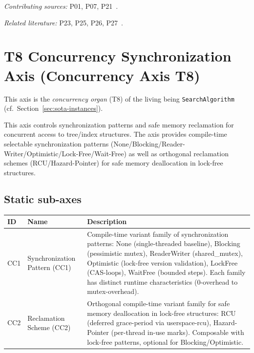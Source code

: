 \emph{Contributing sources:} P01, P07, P21~\cite{leis2013art,wu2019wormhole,chen2001prefetch}.

\emph{Related literature:} P23, P25, P26, P27~\cite{khan2010adaptive,mahling2025hotpath,zhang2024pathprefix,zhang2025hierarchical}.

\section[head={T8 Concurrency Synchronization Axis (Concurrency Axis)}]{T8 Concurrency Synchronization Axis (Concurrency Axis T8)}

This axis is the \emph{concurrency organ} (T8) of the living being \texttt{SearchAlgorithm} (cf.\ Section~\ref{sec:sota-instances}).

This axis controls synchronization patterns and safe memory reclamation for concurrent access to tree/\allowbreak{}index structures. The axis provides compile-time selectable synchronization patterns (None/\allowbreak{}Blocking/\allowbreak{}Reader-Writer/\allowbreak{}Optimistic/\allowbreak{}Lock-Free/\allowbreak{}Wait-Free) as well as orthogonal reclamation schemes (RCU/\allowbreak{}Hazard-Pointer) for safe memory deallocation in lock-free structures.

\subsection*{Static sub-axes}

\begin{scriptsize}
\begin{longtable}{@{}>{\raggedright\arraybackslash}p{1.8cm} >{\raggedright\arraybackslash}p{3.2cm} >{\raggedright\arraybackslash}p{8.5cm}@{}}
\toprule
ID & Name & Description \\
\midrule
\endhead%
CC1 & Synchronization Pattern (CC1) & Compile-time variant family of synchronization patterns: None (single-threaded baseline), Blocking (pessimistic mutex), Reader\allowbreak{}Writer (shared\_\allowbreak{}mutex), Optimistic (lock-free version validation), Lock\allowbreak{}Free (CAS-loops), Wait\allowbreak{}Free (bounded steps). Each family has distinct runtime characteristics (0-overhead to mutex-overhead). \\
CC2 & Reclamation Scheme (CC2) & Orthogonal compile-time variant family for safe memory deallocation in lock-free structures: RCU (deferred grace-period via userspace-rcu), Hazard-Pointer (per-thread in-use marks). Composable with lock-free patterns, optional for Blocking/\allowbreak{}Optimistic. \\
\bottomrule
\end{longtable}
\end{scriptsize}

